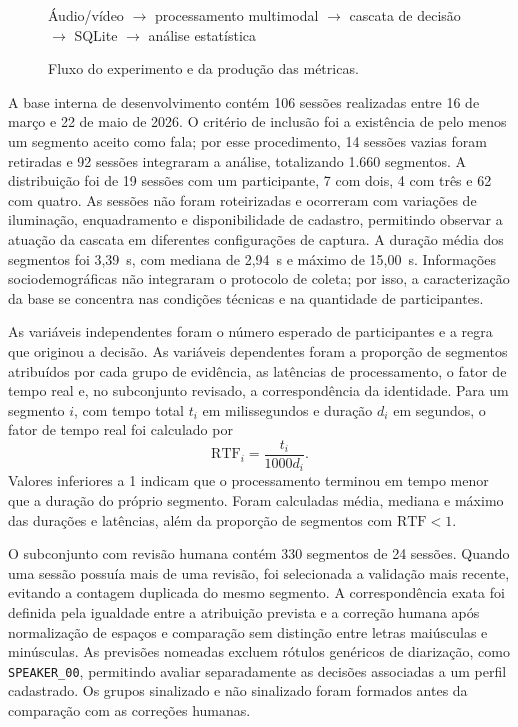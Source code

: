 \documentclass[a4paper,11pt]{article}
\begin{document}
\begin{figure}[H]
    \vspace{-0.2cm}
    \centering
    \footnotesize
    Áudio/vídeo $\rightarrow$ processamento multimodal $\rightarrow$ cascata de decisão $\rightarrow$ SQLite $\rightarrow$ análise estatística
    \caption{Fluxo do experimento e da produção das métricas.}
    \label{fig:experimento}
    \vspace{-0.25cm}
\end{figure}

A base interna de desenvolvimento contém 106 sessões realizadas entre 16 de março e 22 de maio de 2026. O critério de inclusão foi a existência de pelo menos um segmento aceito como fala; por esse procedimento, 14 sessões vazias foram retiradas e 92 sessões integraram a análise, totalizando 1.660 segmentos. A distribuição foi de 19 sessões com um participante, 7 com dois, 4 com três e 62 com quatro. As sessões não foram roteirizadas e ocorreram com variações de iluminação, enquadramento e disponibilidade de cadastro, permitindo observar a atuação da cascata em diferentes configurações de captura. A duração média dos segmentos foi 3,39~s, com mediana de 2,94~s e máximo de 15,00~s. Informações sociodemográficas não integraram o protocolo de coleta; por isso, a caracterização da base se concentra nas condições técnicas e na quantidade de participantes.

As variáveis independentes foram o número esperado de participantes e a regra que originou a decisão. As variáveis dependentes foram a proporção de segmentos atribuídos por cada grupo de evidência, as latências de processamento, o fator de tempo real e, no subconjunto revisado, a correspondência da identidade. Para um segmento $i$, com tempo total $t_i$ em milissegundos e duração $d_i$ em segundos, o fator de tempo real foi calculado por
\begin{equation}
    \mathrm{RTF}_i = \frac{t_i}{1000d_i}.
\end{equation}
Valores inferiores a 1 indicam que o processamento terminou em tempo menor que a duração do próprio segmento. Foram calculadas média, mediana e máximo das durações e latências, além da proporção de segmentos com $\mathrm{RTF}<1$.

O subconjunto com revisão humana contém 330 segmentos de 24 sessões. Quando uma sessão possuía mais de uma revisão, foi selecionada a validação mais recente, evitando a contagem duplicada do mesmo segmento. A correspondência exata foi definida pela igualdade entre a atribuição prevista e a correção humana após normalização de espaços e comparação sem distinção entre letras maiúsculas e minúsculas. As previsões nomeadas excluem rótulos genéricos de diarização, como \texttt{SPEAKER\_00}, permitindo avaliar separadamente as decisões associadas a um perfil cadastrado. Os grupos sinalizado e não sinalizado foram formados antes da comparação com as correções humanas.
\end{document}
